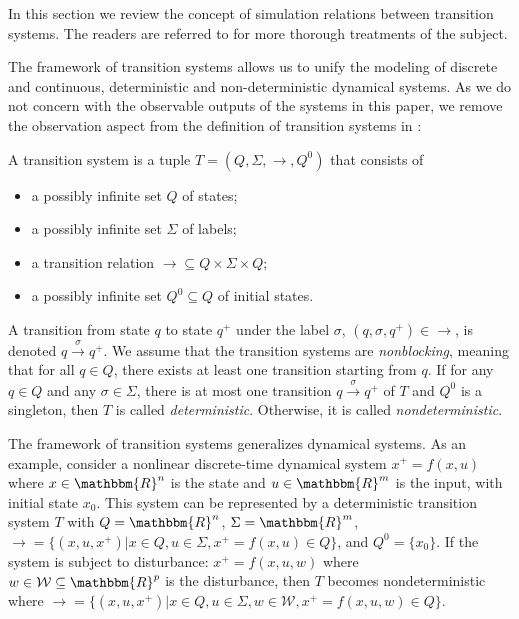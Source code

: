 In this section we review the concept of simulation relations between
transition systems. The readers are referred to \cite{girardetal07amd,aluretal00dah} for more thorough treatments of the subject.

The framework of transition systems allows us to unify the modeling of
discrete and continuous, deterministic and non-deterministic dynamical
systems. As we do not concern with the observable outputs of the systems in
this paper, we remove the observation aspect from the definition of transition
systems in {\cite{girardetal07amd}}:

\begin{definition}
  \label{thm:transition-systems-def}
  A transition system is a tuple $T = (Q, \Sigma, \rightarrow, Q^0)$ that
  consists of
  \begin{itemize}
  \item a possibly infinite set $Q$ of states;
  \item a possibly infinite set $\Sigma$ of labels;
  \item a transition relation $\rightarrow \subseteq Q \times \Sigma \times
    Q$;
  \item a possibly infinite set $Q^0 \subseteq Q$ of initial states.
  \end{itemize}
\end{definition}

A transition from state $q$ to state $q^+$ under the label $\sigma$, {\ie}
$(q, \sigma, q^+) \in \rightarrow$, is denoted $q \xrightarrow{\sigma} q^+$.
We assume that the transition systems are {\emph{nonblocking}}, meaning that
for all $q \in Q$, there exists at least one transition starting from $q$. If
for any $q \in Q$ and any $\sigma \in \Sigma$, there is at most one transition
$q \xrightarrow{\sigma} q^+$ of $T$ and $Q^0$ is a singleton, then $T$ is
called {\emph{deterministic}}. Otherwise, it is called
{\emph{nondeterministic}}.

\begin{example}
  The framework of transition systems generalizes dynamical systems. As an
  example, consider a nonlinear discrete-time dynamical system $x^+ = f (x,
  u)$ where $x \in \mathbbm{R}^n$ is the state and $u \in \mathbbm{R}^m$ is
  the input, with initial state $x_{0}$.
  This system can be represented by a deterministic transition
  system $T$ with $Q =\mathbbm{R}^n$, $\Sigma =\mathbbm{R}^m$,
  $\rightarrow = \{ (x, u, x^+) |x \in Q, u \in \Sigma, x^+ = f (x, u) \in Q
  \}$, and $Q^{0} = \{x_{0}\}$.
  If the system is subject to disturbance: $x^+ = f (x, u, w)$ where
  $w \in \mathcal{W} \subseteq \mathbbm{R}^p$ is the disturbance, then $T$
  becomes nondeterministic where $\rightarrow = \{ (x, u, x^+) |x \in Q, u \in
  \Sigma, w \in \mathcal{W}, x^+ = f (x, u, w) \in Q \}$.
\end{example}

